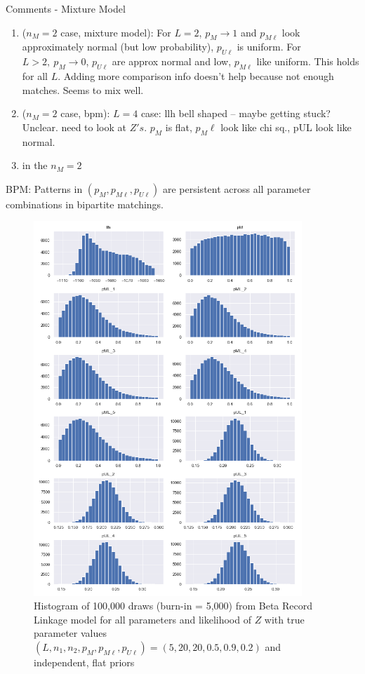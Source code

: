 \documentclass[11pt,reqno]{amsart}
\begin{document}
Comments - Mixture Model

\begin{enumerate} 
\item ($n_M=2$ case, mixture model):  For $L = 2$, $p_M \to 1$ and $p_{M\ell}$ look approximately normal (but low probability), $p_{U\ell}$ is uniform.  For $L>2, \ p_M \to 0 $, $p_{U\ell}$ are approx normal and low, $p_{M\ell}$ like uniform.  This holds for all $L$.  Adding more comparison info doesn't help because not enough matches.  Seems to mix well.
\item ($n_M=2$ case, bpm): $L=4$ case: llh bell shaped -- maybe getting stuck? Unclear. need to look at $Z's$.  $p_M$ is flat, $p_M{\ell}$ look like chi sq., pUL look like normal. %
\item in the $n_M=2$
\end{enumerate}
BPM:
Patterns in $(p_M, p_{M\ell}, p_{U\ell})$ are persistent across all parameter combinations in bipartite matchings. 



\begin{figure}[h!]
\begin{center}
\includegraphics[width=0.9\textwidth]{../Figures/bpm/nM10/allParam_nM10_L5.png}
\caption{Histogram of 100,000 draws (burn-in = 5,000) from Beta Record Linkage model for all parameters and likelihood of $Z$ with true parameter values $(L, n_1, n_2, p_M, p_{M\ell}, p_{U\ell}) = (5, 20, 20, 0.5, 0.9, 0.2)$ and independent, flat priors}
\label{bpmLarge}
\end{center}
\end{figure}
\end{document}
